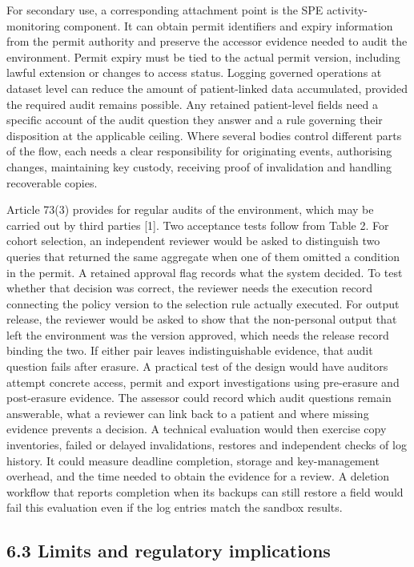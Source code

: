 \documentclass[5p,twocolumn]{elsarticle}
\begin{document}
For secondary use, a corresponding attachment point is the SPE
activity-monitoring component. It can obtain permit identifiers and
expiry information from the permit authority and preserve the accessor
evidence needed to audit the environment. Permit expiry must be tied to
the actual permit version, including lawful extension or changes to
access status. Logging governed operations at dataset level can reduce
the amount of patient-linked data accumulated, provided the required
audit remains possible. Any retained patient-level fields need a
specific account of the audit question they answer and a rule governing
their disposition at the applicable ceiling. Where several bodies
control different parts of the flow, each needs a clear responsibility
for originating events, authorising changes, maintaining key custody,
receiving proof of invalidation and handling recoverable copies.

Article 73(3) provides for regular audits of the environment, which may
be carried out by third parties {[}1{]}. Two acceptance tests follow
from Table 2. For cohort selection, an independent reviewer would be
asked to distinguish two queries that returned the same aggregate when
one of them omitted a condition in the permit. A retained approval flag
records what the system decided. To test whether that decision was
correct, the reviewer needs the execution record connecting the policy
version to the selection rule actually executed. For output release, the
reviewer would be asked to show that the non-personal output that left
the environment was the version approved, which needs the release record
binding the two. If either pair leaves indistinguishable evidence, that
audit question fails after erasure. A practical test of the design would
have auditors attempt concrete access, permit and export investigations
using pre-erasure and post-erasure evidence. The assessor could record
which audit questions remain answerable, what a reviewer can link back
to a patient and where missing evidence prevents a decision. A technical
evaluation would then exercise copy inventories, failed or delayed
invalidations, restores and independent checks of log history. It could
measure deadline completion, storage and key-management overhead, and
the time needed to obtain the evidence for a review. A deletion workflow
that reports completion when its backups can still restore a field would
fail this evaluation even if the log entries match the sandbox results.

\hypertarget{limits-and-regulatory-implications}{%
\subsection{6.3 Limits and regulatory
implications}\label{limits-and-regulatory-implications}}
\end{document}
